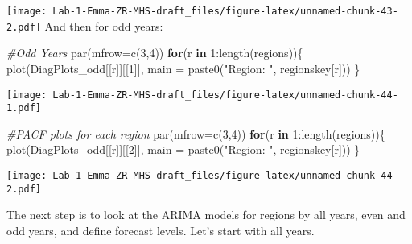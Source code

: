 \documentclass[
]{article}
\newenvironment{Shaded}{\begin{snugshade}}{\end{snugshade}}
\newcommand{\AttributeTok}[1]{\textcolor[rgb]{0.77,0.63,0.00}{#1}}
\newcommand{\CommentTok}[1]{\textcolor[rgb]{0.56,0.35,0.01}{\textit{#1}}}
\newcommand{\ConstantTok}[1]{\textcolor[rgb]{0.00,0.00,0.00}{#1}}
\newcommand{\ControlFlowTok}[1]{\textcolor[rgb]{0.13,0.29,0.53}{\textbf{#1}}}
\newcommand{\DecValTok}[1]{\textcolor[rgb]{0.00,0.00,0.81}{#1}}
\newcommand{\FunctionTok}[1]{\textcolor[rgb]{0.00,0.00,0.00}{#1}}
\newcommand{\NormalTok}[1]{#1}
\newcommand{\OtherTok}[1]{\textcolor[rgb]{0.56,0.35,0.01}{#1}}
\newcommand{\SpecialCharTok}[1]{\textcolor[rgb]{0.00,0.00,0.00}{#1}}
\newcommand{\StringTok}[1]{\textcolor[rgb]{0.31,0.60,0.02}{#1}}
\begin{document}
\texttt{[image: Lab-1-Emma-ZR-MHS-draft\_files/figure-latex/unnamed-chunk-43-2.pdf]}
And then for odd years:

\begin{Shaded}
\begin{Highlighting}[]
\CommentTok{\#Odd Years }
\FunctionTok{par}\NormalTok{(}\AttributeTok{mfrow=}\FunctionTok{c}\NormalTok{(}\DecValTok{3}\NormalTok{,}\DecValTok{4}\NormalTok{))}
\ControlFlowTok{for}\NormalTok{(r }\ControlFlowTok{in} \DecValTok{1}\SpecialCharTok{:}\FunctionTok{length}\NormalTok{(regions))\{}
  \FunctionTok{plot}\NormalTok{(DiagPlots\_odd[[r]][[}\DecValTok{1}\NormalTok{]], }\AttributeTok{main =} \FunctionTok{paste0}\NormalTok{(}\StringTok{"Region: "}\NormalTok{, regionskey[r]))}
\NormalTok{\}}
\end{Highlighting}
\end{Shaded}

\texttt{[image: Lab-1-Emma-ZR-MHS-draft\_files/figure-latex/unnamed-chunk-44-1.pdf]}

\begin{Shaded}
\begin{Highlighting}[]
\CommentTok{\#PACF plots for each region}
\FunctionTok{par}\NormalTok{(}\AttributeTok{mfrow=}\FunctionTok{c}\NormalTok{(}\DecValTok{3}\NormalTok{,}\DecValTok{4}\NormalTok{))}
\ControlFlowTok{for}\NormalTok{(r }\ControlFlowTok{in} \DecValTok{1}\SpecialCharTok{:}\FunctionTok{length}\NormalTok{(regions))\{}
  \FunctionTok{plot}\NormalTok{(DiagPlots\_odd[[r]][[}\DecValTok{2}\NormalTok{]], }\AttributeTok{main =} \FunctionTok{paste0}\NormalTok{(}\StringTok{"Region: "}\NormalTok{, regionskey[r]))}
\NormalTok{\}}
\end{Highlighting}
\end{Shaded}

\texttt{[image: Lab-1-Emma-ZR-MHS-draft\_files/figure-latex/unnamed-chunk-44-2.pdf]}

The next step is to look at the ARIMA models for regions by all years,
even and odd years, and define forecast levels. Let's start with all
years.

\begin{Shaded}
\end{Shaded}
\end{document}
